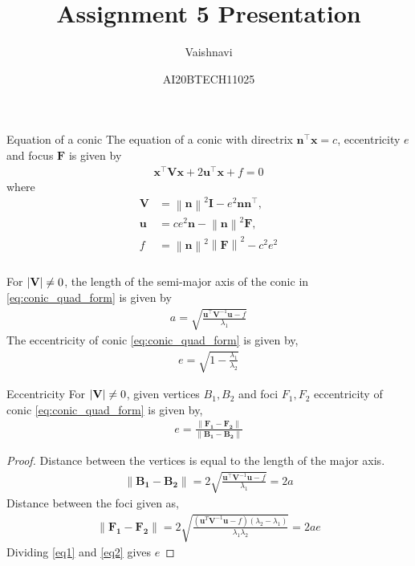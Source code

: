 \documentclass{beamer}
\title{Assignment 5 Presentation}
\author{Vaishnavi}
\date{AI20BTECH11025}
\let\vec\mathbf
\newcommand\norm[1]{\left\lVert#1\right\rVert}
\renewcommand{\vec}[1]{\mathbf{#1}}
\begin{document}
\begin{frame}
\titlepage
\end{frame}

\begin{frame}
\frametitle{}
\begin{block}{Equation of a conic}
The equation of  a conic with directrix $\vec{n}^{\top}\vec{x} = c$, eccentricity $e$ and focus $\vec{F}$ is given by 
\begin{align}
    \label{eq:conic_quad_form}
    \vec{x}^{\top}\vec{V}\vec{x}+2\vec{u}^{\top}\vec{x}+f=0
\end{align}
where     
\begin{align}
    \label{eq:conic_quad_form_v}
    \vec{V} &=\norm{\vec{n}}^2\vec{I}-e^2\vec{n}\vec{n}^{\top}, \\
    \label{eq:conic_quad_form_u}
    \vec{u} &= ce^2\vec{n}-\norm{\vec{n}}^2\vec{F}, \\
    \label{eq:conic_quad_form_f}
    f &= \norm{\vec{n}}^2\norm{\vec{F}}^2-c^2e^2
\end{align}
\end{block}
\end{frame}
\begin{frame}
\frametitle{}
\begin{block}{}
For $\abs{\vec{V}} \ne 0$, the length of the semi-major axis of the conic in \eqref{eq:conic_quad_form} is given by 
\begin{align} 
    \label{eq:ab} a = \sqrt{\frac{\vec{u}^{\top}\vec{V}^{-1}\vec{u}-f}{\lambda_1}}
\end{align}
The eccentricity of conic \eqref{eq:conic_quad_form} is given by,
\begin{align}
    \label{eq:eccentricity} e = \sqrt{1 - \frac{\lambda_1}{\lambda_2}}
\end{align}
\end{block}
\end{frame}
\begin{frame}{Eccentricity}
For $\abs{\vec{V}} \ne 0$, given vertices $B_1,B_2$ and foci $F_1,F_2$ eccentricity of conic \eqref{eq:conic_quad_form} is given by,
\begin{align}
    \label{eq:eccentricity} e = \frac{\norm{\vec{F_1}-\vec{F_2}}}{\norm{\vec{B_1}-\vec{B_2}}}
\end{align}
\begin{proof}
Distance between the vertices is equal to the length of the major axis.
\begin{align}
    \label{eq1} \norm{\vec{B_1}-\vec{B_2}} = 2\sqrt{\frac{\vec{u}^{\top}\vec{V}^{-1}\vec{u} -f}{\lambda_1}} = 2a
\end{align}
Distance between the foci given as,
\begin{align}
    \label{eq2} \norm{\vec{F_1}-\vec{F_2}} = 2\sqrt{\frac{(\vec{u}^T\vec{V}^{-1}\vec{u}-f)(\lambda_2-\lambda_1)}{\lambda_1\lambda_2}} = 2ae
\end{align}
Dividing \eqref{eq1} and \eqref{eq2} gives $e$
\end{proof}
\end{frame}
\end{document}
